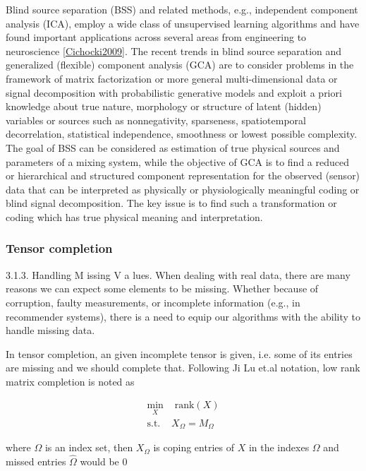 \documentclass[letterpaper,12pt]{article}
\begin{document}
Blind source separation (BSS) and related methods, e.g., independent component analysis (ICA), employ a wide class of unsupervised learning algorithms and have found important applications across several areas from engineering to neuroscience \ref{Cichocki2009}. The recent trends in blind source separation and generalized (flexible) component analysis (GCA) are to consider problems in the framework of matrix factorization or more general multi-dimensional data or signal decomposition with probabilistic generative models and exploit a priori knowledge about true nature, morphology or structure of latent (hidden) variables or sources such as nonnegativity, sparseness, spatiotemporal decorrelation, statistical independence, smoothness or lowest possible complexity. The goal of BSS can be considered as estimation of true physical sources and parameters of a mixing system, while the objective of GCA is to find a reduced or hierarchical and structured component representation for the observed (sensor) data that can be interpreted as physically or physiologically meaningful coding or blind signal decomposition. The key issue is to find such a transformation or coding which has true physical meaning and interpretation.

 \subsubsection{Tensor completion}
 
 3.1.3. Handling M issing V a lues. When dealing with real data, there are many reasons we can expect some elements to be missing. Whether because of corruption, faulty measurements, or incomplete information (e.g., in recommender systems), there is a need to equip our algorithms with the ability to handle missing data.\cite{Papalexakis2016}
 
 In tensor completion, an given incomplete tensor is given, i.e. some of its entries are missing and we should complete that. Following Ji Lu et.al \cite{Liu2013} notation,  low rank matrix completion is noted as

\begin{equation} 
 \begin{split}
  \min_X & \text{ rank}(X)\\
  \text{s.t. } & X_\Omega = M_\Omega
 \end{split}
\end{equation}



where $\Omega$ is an index set, then $X_\Omega$ is coping entries of $X$ in the indexes $\Omega$ and missed entries $\hat{\Omega}$ would be $0$
\end{document}
